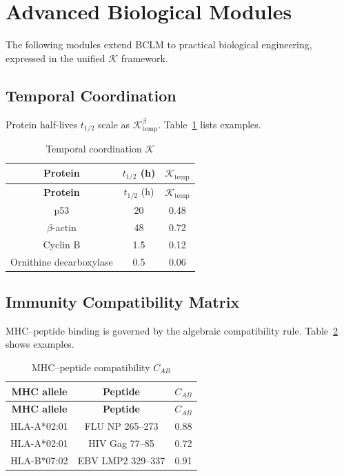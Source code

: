 \documentclass[12pt,a4paper]{article}
\newcommand{\REL}{\mathcal{K}}          %
\begin{document}
	\section{Advanced Biological Modules}
	\label{sec:modules}
	The following modules extend BCLM to practical biological engineering, expressed in the unified \(\REL\) framework.
	
	\subsection{Temporal Coordination}
	Protein half‑lives \(t_{1/2}\) scale as \(\REL_{\mathrm{temp}}^{\beta}\). Table~\ref{tab:temporal} lists examples.
	
	\begin{longtable}{|c|c|c|}
		\caption{Temporal coordination \(\REL\)}\label{tab:temporal}\\
		\hline
		\textbf{Protein} & \(t_{1/2}\) (h) & \(\REL_{\mathrm{temp}}\) \\
		\hline
		\endfirsthead
		\hline
		\textbf{Protein} & \(t_{1/2}\) (h) & \(\REL_{\mathrm{temp}}\) \\
		\hline
		\endhead
		\hline
		p53 & 20 & 0.48 \\
		\(\beta\)-actin & 48 & 0.72 \\
		Cyclin B & 1.5 & 0.12 \\
		Ornithine decarboxylase & 0.5 & 0.06 \\
		\hline
	\end{longtable}
	
	\subsection{Immunity Compatibility Matrix}
	MHC–peptide binding is governed by the algebraic compatibility rule. Table~\ref{tab:mhc} shows examples.
	
	\begin{longtable}{|c|c|c|}
		\caption{MHC–peptide compatibility \(C_{AB}\)}\label{tab:mhc}\\
		\hline
		\textbf{MHC allele} & \textbf{Peptide} & \(C_{AB}\) \\
		\hline
		\endfirsthead
		\hline
		\textbf{MHC allele} & \textbf{Peptide} & \(C_{AB}\) \\
		\hline
		\endhead
		\hline
		HLA-A*02:01 & FLU NP 265–273 & 0.88 \\
		HLA-A*02:01 & HIV Gag 77–85 & 0.72 \\
		HLA-B*07:02 & EBV LMP2 329–337 & 0.91 \\
		\hline
	\end{longtable}
	
\end{document}
